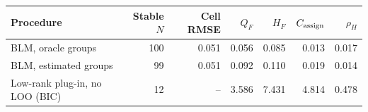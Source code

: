 \begin{tabular}{lrrrrrr}
\toprule
Procedure & Stable $N$ & Cell RMSE & $Q_F$ & $H_F$ & $C_{\rm assign}$ & $\rho_H$ \\
\midrule
BLM, oracle groups & 100 & 0.051 & 0.056 & 0.085 & 0.013 & 0.017 \\
BLM, estimated groups & 99 & 0.051 & 0.092 & 0.110 & 0.019 & 0.014 \\
Low-rank plug-in, no LOO (BIC) & 12 & -- & 3.586 & 7.431 & 4.814 & 0.478 \\
\bottomrule
\end{tabular}

